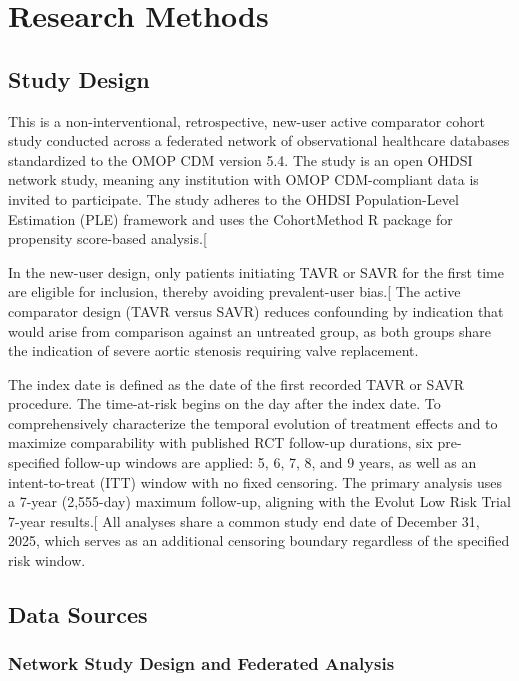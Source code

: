 \documentclass[
  12pt,
]{article}
\begin{document}
\section{Research Methods}\label{research-methods}

\subsection{Study Design}\label{study-design}

This is a non-interventional, retrospective, new-user active comparator
cohort study conducted across a federated network of observational
healthcare databases standardized to the OMOP CDM version 5.4. The study
is an open OHDSI network study, meaning any institution with OMOP
CDM-compliant data is invited to participate. The study adheres to the
OHDSI Population-Level Estimation (PLE) framework and uses the
CohortMethod R package for propensity score-based
analysis.{[}\citeproc{ref-Schuemie2020-fa}{17}{]}

In the new-user design, only patients initiating TAVR or SAVR for the
first time are eligible for inclusion, thereby avoiding prevalent-user
bias.{[}\citeproc{ref-Suissa2008}{18}{]} The active comparator design
(TAVR versus SAVR) reduces confounding by indication that would arise
from comparison against an untreated group, as both groups share the
indication of severe aortic stenosis requiring valve replacement.

The index date is defined as the date of the first recorded TAVR or SAVR
procedure. The time-at-risk begins on the day after the index date. To
comprehensively characterize the temporal evolution of treatment effects
and to maximize comparability with published RCT follow-up durations,
six pre-specified follow-up windows are applied: 5, 6, 7, 8, and 9
years, as well as an intent-to-treat (ITT) window with no fixed
censoring. The primary analysis uses a 7-year (2,555-day) maximum
follow-up, aligning with the Evolut Low Risk Trial 7-year
results.{[}\citeproc{ref-Forrest2026}{16}{]} All analyses share a common
study end date of December 31, 2025, which serves as an additional
censoring boundary regardless of the specified risk window.

\subsection{Data Sources}\label{data-sources}

\subsubsection{Network Study Design and Federated
Analysis}\label{network-study-design-and-federated-analysis}
\end{document}
